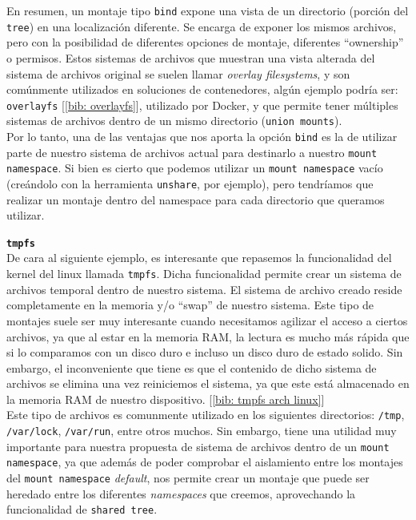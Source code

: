 \documentclass[12pt]{article}
\begin{document}
	\pagebreak

	\noindent En resumen, un montaje tipo \texttt{bind} expone una vista de un directorio (porción del \texttt{tree}) en una localización diferente. Se encarga de exponer los mismos archivos, pero con la posibilidad de diferentes opciones de montaje, diferentes ``ownership'' o permisos. Estos sistemas de archivos que muestran una vista alterada del sistema de archivos original se suelen llamar \textit{overlay filesystems}, y son comúnmente utilizados en soluciones de contenedores, algún ejemplo podría ser: \texttt{overlayfs} [\ref{bib: overlayfs}], utilizado por Docker, y que permite tener múltiples sistemas de archivos dentro de un mismo directorio (\texttt{union mounts}). \\

	\noindent Por lo tanto, una de las ventajas que nos aporta la opción \texttt{bind} es la de utilizar parte de nuestro sistema de archivos actual para destinarlo a nuestro \texttt{mount namespace}. Si bien es cierto que podemos utilizar un \texttt{mount namespace} vacío (creándolo con la herramienta \texttt{unshare}, por ejemplo), pero tendríamos que realizar un montaje dentro del namespace para cada directorio que queramos utilizar.
	
	\pagebreak
	
	\noindent \textbf{\large \texttt{tmpfs}}\\
	
	\noindent De cara al siguiente ejemplo, es interesante que repasemos la funcionalidad del kernel del linux llamada \texttt{tmpfs}. Dicha funcionalidad permite crear un sistema de archivos temporal dentro de nuestro sistema. El sistema de archivo creado reside completamente en la memoria y/o ``swap'' de nuestro sistema. Este tipo de montajes suele ser muy interesante cuando necesitamos agilizar el acceso a ciertos archivos, ya que al estar en la memoria RAM, la lectura es mucho más rápida que si lo comparamos con un disco duro e incluso un disco duro de estado solido. Sin embargo, el inconveniente que tiene es que el contenido de dicho sistema de archivos se elimina una vez reiniciemos el sistema, ya que este está almacenado en la memoria RAM de nuestro dispositivo. [\ref{bib: tmpfs arch linux}] \\
	
	\noindent Este tipo de archivos es comunmente utilizado en los siguientes directorios: \texttt{/tmp}, \texttt{/var/lock}, \texttt{/var/run}, entre otros muchos. Sin embargo, tiene una utilidad muy importante para nuestra propuesta de sistema de archivos dentro de un \texttt{mount namespace}, ya que además de poder comprobar el aislamiento entre los montajes del \texttt{mount namespace} \textit{default}, nos permite crear un montaje que puede ser heredado entre los diferentes \textit{namespaces} que creemos, aprovechando la funcionalidad de \texttt{shared tree}. \\
	
\end{document}
